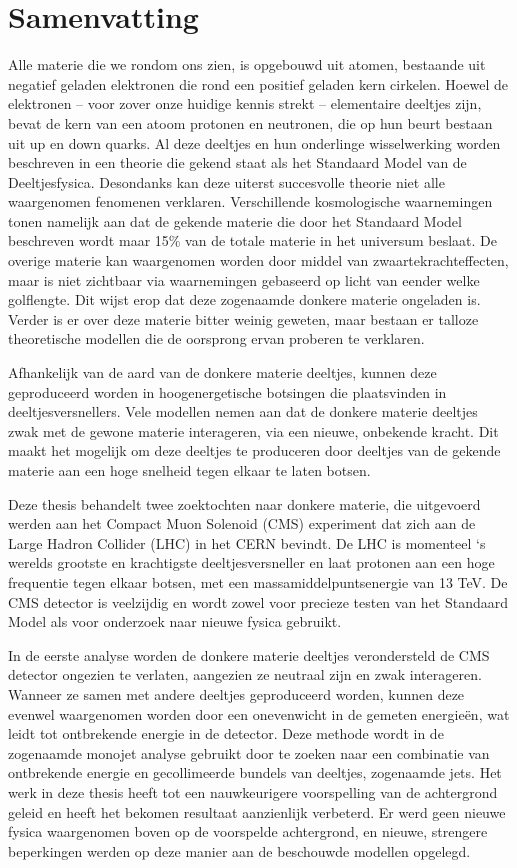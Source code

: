 
\chapter*{Samenvatting}

Alle materie die we rondom ons zien, is opgebouwd uit atomen, bestaande uit negatief geladen elektronen die rond een positief geladen kern cirkelen. Hoewel de elektronen -- voor zover onze huidige kennis strekt -- elementaire deeltjes zijn, bevat de kern van een atoom protonen en neutronen, die op hun beurt bestaan uit up en down quarks. Al deze deeltjes en hun onderlinge wisselwerking worden beschreven in een theorie die gekend staat als het Standaard Model van de Deeltjesfysica. Desondanks kan deze uiterst succesvolle theorie niet alle waargenomen fenomenen verklaren. Verschillende kosmologische waarnemingen tonen namelijk aan dat de gekende materie die door het Standaard Model beschreven wordt maar 15\% van de totale materie in het universum beslaat. De overige materie kan waargenomen worden door middel van  zwaartekrachteffecten, maar is niet zichtbaar via waarnemingen gebaseerd op licht van eender welke golflengte. Dit wijst erop dat deze zogenaamde donkere materie ongeladen is. Verder is er over deze materie bitter weinig geweten, maar bestaan er talloze theoretische modellen die de oorsprong ervan proberen te verklaren.

Afhankelijk van de aard van de donkere materie deeltjes, kunnen deze geproduceerd worden in hoogenergetische botsingen die plaatsvinden in deeltjesversnellers. Vele modellen nemen aan dat de donkere materie deeltjes zwak met de gewone materie interageren, via een nieuwe, onbekende kracht. Dit maakt het mogelijk om deze deeltjes te produceren door deeltjes van de gekende materie aan een hoge snelheid tegen elkaar te laten botsen.

Deze thesis behandelt twee zoektochten naar donkere materie, die uitgevoerd werden aan het Compact Muon Solenoid (CMS) experiment dat zich aan de Large Hadron Collider (LHC) in het CERN bevindt. De LHC is momenteel ‘s werelds grootste en krachtigste deeltjesversneller en laat protonen aan een hoge frequentie tegen elkaar botsen, met een massamiddelpuntsenergie van 13 TeV. De CMS detector is veelzijdig en wordt zowel voor precieze testen van het Standaard Model als voor onderzoek naar nieuwe fysica gebruikt.

In de eerste analyse worden de donkere materie deeltjes verondersteld de CMS detector ongezien te verlaten, aangezien ze neutraal zijn en zwak interageren. Wanneer ze samen met andere deeltjes geproduceerd worden, kunnen deze evenwel waargenomen worden door een onevenwicht in de gemeten energieën, wat leidt tot ontbrekende energie in de detector. Deze methode wordt in de zogenaamde monojet analyse gebruikt door te zoeken naar een combinatie van ontbrekende energie en gecollimeerde bundels van deeltjes, zogenaamde jets. Het werk in deze thesis heeft tot een nauwkeurigere voorspelling van de achtergrond geleid en heeft het bekomen resultaat aanzienlijk verbeterd. Er werd geen nieuwe fysica waargenomen boven op de voorspelde achtergrond, en nieuwe, strengere beperkingen werden op deze manier aan de beschouwde modellen opgelegd.


